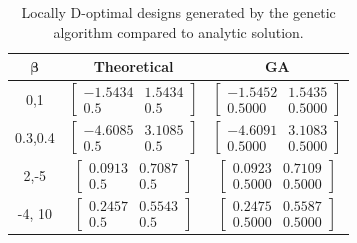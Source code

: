 \documentclass[11pt,a4paper]{article}
\begin{document}
\begin{table}[ht]
\centering
\begin{tabular}{|c|c|c|}
\hline 
$\mathbf{\beta}$ & \textbf{Theoretical} & \textbf{GA} \\ 
\hline 
0,1 & $\begin{bmatrix}
-1.5434 & 1.5434\\ 0.5 & 0.5
\end{bmatrix}$  & $\begin{bmatrix}
-1.5452 & 1.5435\\ 0.5000 & 0.5000
\end{bmatrix}$ \\ 
\hline 
0.3,0.4 & $\begin{bmatrix}
-4.6085 & 3.1085\\ 0.5 & 0.5
\end{bmatrix}$  & $\begin{bmatrix}
-4.6091 & 3.1083\\ 0.5000 & 0.5000
\end{bmatrix}$ \\ 
\hline 
2,-5 & $\begin{bmatrix}
0.0913 & 0.7087\\ 0.5 & 0.5
\end{bmatrix}$  & $\begin{bmatrix}
0.0923 & 0.7109\\ 0.5000 & 0.5000
\end{bmatrix}$  \\ 
\hline
-4, 10 & $\begin{bmatrix}
0.2457 & 0.5543\\ 0.5 & 0.5
\end{bmatrix}$  & $\begin{bmatrix}
0.2475 & 0.5587\\ 0.5000 & 0.5000
\end{bmatrix}$\\
\hline 

\end{tabular} 
\caption{Locally D-optimal designs generated by the genetic algorithm compared to analytic solution.}
\end{table}
\end{document}
